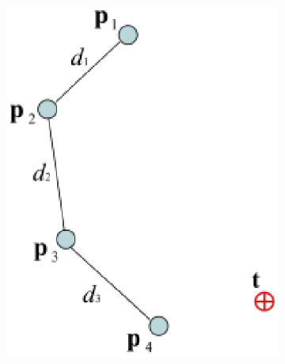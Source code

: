 \begin{figure}
    \centering
    \captionsetup{justification=centering}
    \begin{subfigure}{0.2\textwidth}
        \centering
        \includegraphics[width=\linewidth]{grafika/fabrik_iteration1.eps}
        \subcaption{}
        \label{fig:fabrik1}
    \end{subfigure}
    \begin{subfigure}{0.2\textwidth}
        \centering

\end{subfigure}
\end{figure}
